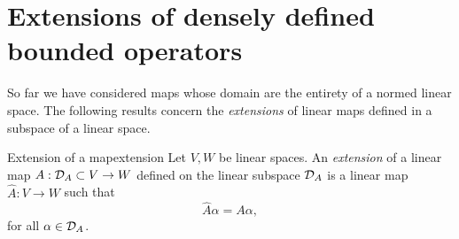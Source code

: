 \section{Extensions of densely defined bounded operators}
So far we have considered maps whose domain are the entirety of a normed linear space. The following results concern the \emph{extensions} of linear maps defined in a subspace of a linear space.
\begin{definition}{Extension of a map}{extension}
    Let \(V, W\) be linear spaces. An \emph{extension} of a linear map \(A : \mathcal{D}_{A} \subset V \to W\) defined on the linear subspace \(\mathcal{D}_{A}\) is a linear map \(\hat{A} : V \to W\) such that
    \begin{equation*}
        \hat{A}\alpha = A \alpha,
    \end{equation*}
    for all \(\alpha \in \mathcal{D}_{A}\).
\end{definition}

